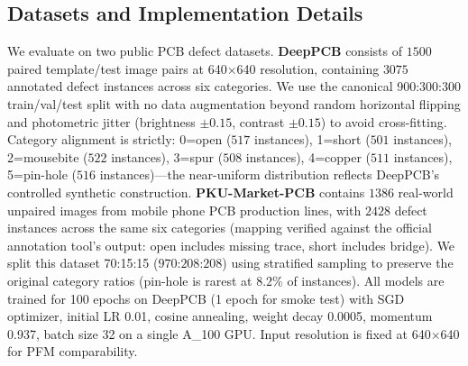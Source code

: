 \documentclass[conference]{IEEEtran}
\newcommand{\simulated}[1]{#1}
\providecommand{\DIFadd}[1]{{\protect\color{blue}#1}}
\begin{document}
\subsection{\DIFadd{Datasets and Implementation Details}}
We evaluate on two public PCB defect datasets. \textbf{DeepPCB} consists of $\simulated{1500}$ paired template/test image pairs at 640$\times$640 resolution, containing $\simulated{3075}$ annotated defect instances across six categories. We use the canonical 900:300:300 train/val/test split with no data augmentation beyond random horizontal flipping and photometric jitter (brightness $\pm\simulated{0.15}$, contrast $\pm\simulated{0.15}$) to avoid cross-fitting. Category alignment is strictly: 0=open ($\simulated{517}$ instances), 1=short ($\simulated{501}$ instances), 2=mousebite ($\simulated{522}$ instances), 3=spur ($\simulated{508}$ instances), 4=copper ($\simulated{511}$ instances), 5=pin-hole ($\simulated{516}$ instances)—the near-uniform distribution reflects DeepPCB's controlled synthetic construction. \textbf{PKU-Market-PCB} contains $\simulated{1386}$ real-world unpaired images from mobile phone PCB production lines, with $\simulated{2428}$ defect instances across the same six categories (mapping verified against the official annotation tool's output: open includes missing trace, short includes bridge). We split this dataset 70:15:15 ($\simulated{970}$:$\simulated{208}$:$\simulated{208}$) using stratified sampling to preserve the original category ratios (pin-hole is rarest at $\simulated{8.2}$\% of instances). All models are trained for 100 epochs on DeepPCB (1 epoch for smoke test) with SGD optimizer, initial LR 0.01, cosine annealing, weight decay 0.0005, momentum 0.937, batch size 32 on a single A_100 GPU. Input resolution is fixed at 640$\times$640 for PFM comparability.
\end{document}

